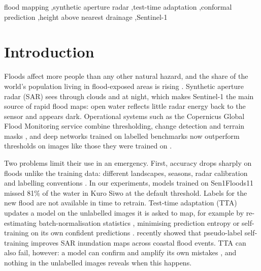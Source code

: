 \documentclass[a4paper,fleqn]{cas-sc}
\begin{document}


\begin{keywords}
flood mapping \sep synthetic aperture radar \sep test-time adaptation \sep conformal prediction \sep height above nearest drainage \sep Sentinel-1
\end{keywords}

\maketitle
{}

\section{Introduction}
\label{sec:intro}

Floods affect more people than any other natural hazard, and the share of the world's population living in flood-exposed areas is rising \citep{tellman2021exposure}. Synthetic aperture radar (SAR) sees through clouds and at night, which makes Sentinel-1 \citep{torres2012sentinel1} the main source of rapid flood maps: open water reflects little radar energy back to the sensor and appears dark. Operational systems such as the Copernicus Global Flood Monitoring service combine thresholding, change detection and terrain masks \citep{salamon2021gfm,twele2016s1chain,zhao2021exclusion}, and deep networks trained on labelled benchmarks \citep{bonafilia2020sen1floods11,bountos2024kurosiwo,montello2022mmflood} now outperform thresholds on images like those they were trained on \citep{bentivoglio2022review,helleis2022benchmark}.

Two problems limit their use in an emergency. First, accuracy drops sharply on floods unlike the training data: different landscapes, seasons, radar calibration and labelling conventions \citep{bentivoglio2022review,turkmenli2025dgflood}. In our experiments, models trained on Sen1Floods11 missed 81\% of the water in Kuro Siwo at the default threshold. Labels for the new flood are not available in time to retrain. Test-time adaptation (TTA) updates a model on the unlabelled images it is asked to map, for example by re-estimating batch-normalisation statistics \citep{li2018adabn,schneider2020covariate}, minimising prediction entropy \citep{wang2021tent} or self-training on its own confident predictions \citep{tarvainen2017meanteacher,wang2022cotta}. \citet{chen2026cimttda} recently showed that pseudo-label self-training improves SAR inundation maps across coastal flood events. TTA can also fail, however: a model can confirm and amplify its own mistakes \citep{niu2022eata,niu2023sar}, and nothing in the unlabelled images reveals when this happens.
\end{document}
